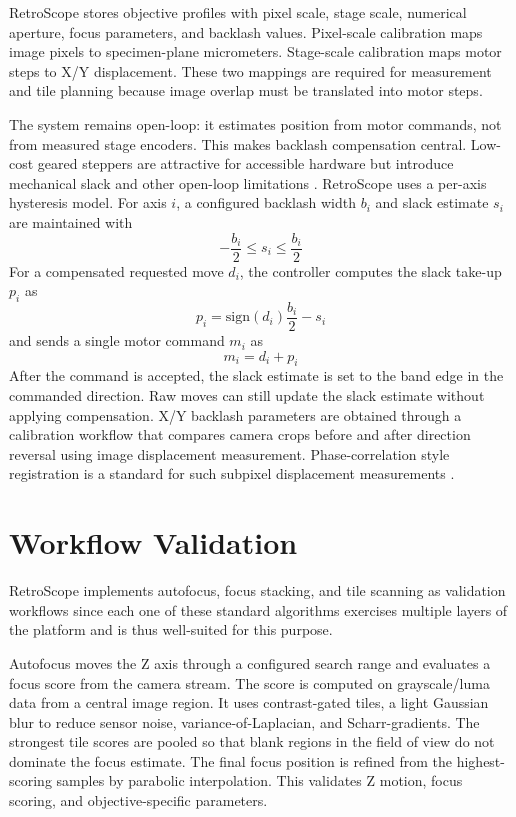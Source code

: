 \documentclass[runningheads]{llncs}
\begin{document}
RetroScope stores objective profiles with pixel scale, stage scale, numerical aperture, focus parameters, and backlash values. Pixel-scale calibration maps image pixels to specimen-plane micrometers. Stage-scale calibration maps motor steps to X/Y displacement. These two mappings are required for measurement and tile planning because image overlap must be translated into motor steps.

The system remains open-loop: it estimates position from motor commands, not from measured stage encoders. This makes backlash compensation central. Low-cost geared steppers are attractive for accessible hardware but introduce mechanical slack and other open-loop limitations \cite{acarnley2002stepping}. RetroScope uses a per-axis hysteresis model. For axis $i$, a configured backlash width $b_i$ and slack estimate $s_i$ are maintained with
\[
    -\frac{b_i}{2} \leq s_i \leq \frac{b_i}{2}
\]
For a compensated requested move $d_i$, the controller computes the slack take-up $p_i$ as
\[
    p_i = \mathrm{sign}(d_i)\frac{b_i}{2} - s_i
\]
and sends a single motor command $m_i$ as
\[
    m_i = d_i + p_i
\]
After the command is accepted, the slack estimate is set to the band edge in the commanded direction. Raw moves can still update the slack estimate without applying compensation. X/Y backlash parameters are obtained through a calibration workflow that compares camera crops before and after direction reversal using image displacement measurement. Phase-correlation style registration is a standard for such subpixel displacement measurements \cite{guizar2008subpixel}.


\section{Workflow Validation}

RetroScope implements autofocus, focus stacking, and tile scanning as validation workflows since each one of these standard algorithms exercises multiple layers of the platform and is thus well-suited for this purpose.

Autofocus moves the Z axis through a configured search range and evaluates a focus score from the camera stream. The score is computed on grayscale/luma data from a central image region. It uses contrast-gated tiles, a light Gaussian blur to reduce sensor noise, variance-of-Laplacian, and Scharr-gradients. The strongest tile scores are pooled so that blank regions in the field of view do not dominate the focus estimate. The final focus position is refined from the highest-scoring samples by parabolic interpolation. This validates Z motion, focus scoring, and objective-specific parameters.
\end{document}
